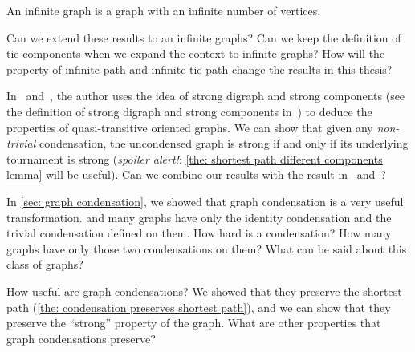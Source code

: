 \begin{definition}
  An infinite graph is a graph with an infinite number of vertices.
\end{definition}

Can we extend these results to an infinite graphs?
Can we keep the definition of tie components when
we expand the context to infinite graphs?
How will the property of infinite path
and infinite tie path change the results in this thesis?

In~\cite{bang-jensen_kings_1998}
and~\cite{bangjensen_quasitransitive_1995},
the author uses the idea of strong digraph and strong components
(see the definition of strong digraph and strong components
in~\cite{west_introduction_2001})
to deduce the properties of quasi-transitive oriented graphs.
We can show that given any \emph{non-trivial} condensation,
the uncondensed graph is strong
if and only if its underlying tournament is strong
(\emph{spoiler alert!}:
\cref{the: shortest path different components lemma} will be useful).
Can we combine our results with the result
in~\cite{bang-jensen_kings_1998} and~\cite{bangjensen_quasitransitive_1995}?

In \cref{sec: graph condensation},
we showed that graph condensation is a very useful transformation.
and many graphs have only the identity condensation
and the trivial condensation defined on them.
How hard is a condensation?
How many graphs have only those two condensations on them?
What can be said about this class of graphs?

How useful are graph condensations?
We showed that they preserve the shortest path
(\cref{the: condensation preserves shortest path}),
and we can show that they preserve the ``strong'' property of the graph.
What are other properties that graph condensations preserve?
